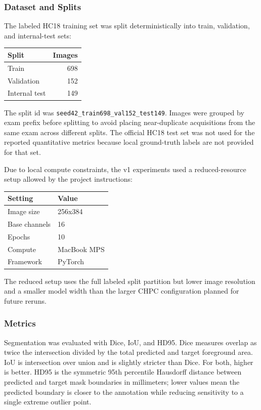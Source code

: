 \documentclass[
  10pt,
]{article}
\begin{document}
\subsubsection{Dataset and Splits}\label{dataset-and-splits}

The labeled HC18 training set was split deterministically into train,
validation, and internal-test sets:

\begin{longtable}[]{@{}lr@{}}
\toprule\noalign{}
Split & Images \\
\midrule\noalign{}
\endhead
\bottomrule\noalign{}
\endlastfoot
Train & 698 \\
Validation & 152 \\
Internal test & 149 \\
\end{longtable}

The split id was \texttt{seed42\_train698\_val152\_test149}. Images were
grouped by exam prefix before splitting to avoid placing near-duplicate
acquisitions from the same exam across different splits. The official
HC18 test set was not used for the reported quantitative metrics because
local ground-truth labels are not provided for that set.

Due to local compute constraints, the v1 experiments used a
reduced-resource setup allowed by the project instructions:

\begin{longtable}[]{@{}ll@{}}
\toprule\noalign{}
Setting & Value \\
\midrule\noalign{}
\endhead
\bottomrule\noalign{}
\endlastfoot
Image size & 256x384 \\
Base channels & 16 \\
Epochs & 10 \\
Compute & MacBook MPS \\
Framework & PyTorch \\
\end{longtable}

The reduced setup uses the full labeled split partition but lower image
resolution and a smaller model width than the larger CHPC configuration
planned for future reruns.

\subsubsection{Metrics}\label{metrics}

Segmentation was evaluated with Dice, IoU, and HD95. Dice measures
overlap as twice the intersection divided by the total predicted and
target foreground area. IoU is intersection over union and is slightly
stricter than Dice. For both, higher is better. HD95 is the symmetric
95th percentile Hausdorff distance between predicted and target mask
boundaries in millimeters; lower values mean the predicted boundary is
closer to the annotation while reducing sensitivity to a single extreme
outlier point.
\end{document}
